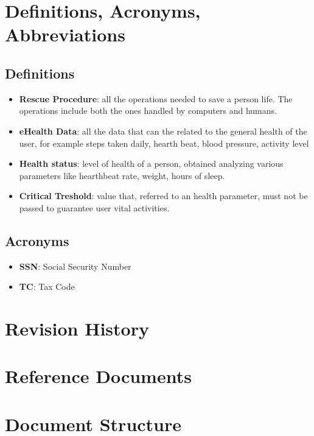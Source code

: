 \section{Definitions, Acronyms, Abbreviations}
\subsection{Definitions}
\begin{itemize}
\item \textbf{Rescue Procedure}: all the operations needed to save a person life. The operations include both the ones handled by computers and humans.
\item \textbf{eHealth Data}: all the data that can the related to the general health of the user, for example steps taken daily, hearth beat, blood pressure, activity level
\item \textbf{Health status}: level of health of a person, obtained analyzing various parameters like  hearthbeat rate, weight, hours of sleep.
\item \textbf{Critical Treshold}: value that, referred to an health parameter, must not be passed to guarantee user vital activities.
\end{itemize}




\subsection{Acronyms}

\begin{itemize}
\item \textbf{SSN}: Social Security Number
\item \textbf{TC}: Tax Code
\end{itemize}




\section{Revision History}
\section{Reference Documents}
\section{Document Structure}